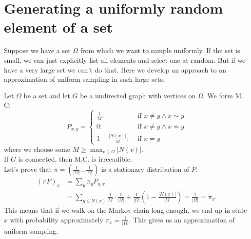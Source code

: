\documentclass[a4paper, 12pt]{book}
\theoremstyle{definition}
\theoremstyle{remark}
\begin{document}
\section{Generating a uniformly random element of a set}

Suppose we have a set $\Omega$ from which we want to sample uniformly. If the set is small, we can just explicitly list all elements
and select one at random. But if we have a very large set we can't do that. Here we develop an approach to an approximation of 
uniform sampling in such large sets.

Let $\Omega$ be a set and let $G$ be a undirected graph with vertices on $\Omega$. We form M. C: 
$$P_{x,y} = \begin{cases}
  \frac{1}{M}: &\text{ if } x \neq y \land x \sim y \\
  0: &\text{ if } x \neq y \land x \nsim y \\
  1 - \frac{|N(x)|}{M}: &\text{ if } x = y
\end{cases}$$
where we choose some $M \geq \max_{v \in \Omega} |N(v)|$. \\
If $G$ is connected, then M.C. is irrecudible. \\
Let's prove that $\pi = (\frac{1}{|\Omega|} \dots \frac{1}{|\Omega|})$ is a stationary distribution of $P$.
\begin{align*}
  (\pi P)_x &= \sum_y \pi_y P_{y,x} \\
  &= \sum_{y \in N(x)} \frac{1}{M} \cdot \frac{1}{|\Omega|} + \frac{1}{|\Omega|}
    \left(1 - \frac{|N(x)|}{M}\right) = \frac{1}{|\Omega|} = \pi_x.
\end{align*}
This means that if we walk on the Markov chain long enough, we end up in state $x$ with probability approximately $\pi_x = \frac{1}{|\Omega|}$.
This gives us an approximation of uniform sampling.
\end{document}
